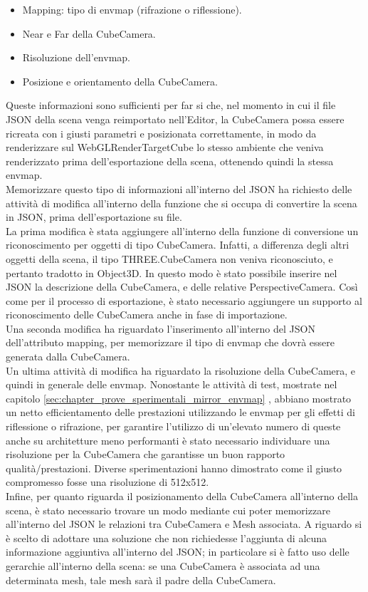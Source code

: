 \begin{itemize}
\item Mapping: tipo di envmap (rifrazione o riflessione).
\item Near e Far della CubeCamera.
\item Risoluzione dell’envmap.
\item Posizione e orientamento della CubeCamera.
\end{itemize}
Queste informazioni sono sufficienti per far si che, nel momento in cui il file JSON della scena venga reimportato nell’Editor, la CubeCamera possa essere ricreata con i giusti parametri e posizionata correttamente, in modo da renderizzare sul WebGLRenderTargetCube lo stesso ambiente che veniva renderizzato prima dell’esportazione della scena, ottenendo quindi la stessa envmap.
\\
Memorizzare questo tipo di informazioni all’interno del JSON ha richiesto delle attività di modifica all’interno della funzione che si occupa di convertire la scena in JSON, prima dell’esportazione su file.
\\
La prima modifica è stata aggiungere all’interno della funzione di conversione un riconoscimento per oggetti di tipo CubeCamera. Infatti, a differenza degli altri oggetti della scena, il tipo THREE.CubeCamera non veniva riconosciuto, e pertanto tradotto in Object3D. In questo modo è stato possibile inserire nel JSON la descrizione della CubeCamera, e delle relative PerspectiveCamera. Così come per il processo di esportazione, è stato necessario aggiungere un supporto al riconoscimento delle CubeCamera anche in fase di importazione.
\\ 
Una seconda modifica ha riguardato l’inserimento all’interno del JSON dell’attributo mapping, per memorizzare il tipo di envmap che dovrà essere generata dalla CubeCamera.
\\
Un ultima attività di modifica ha riguardato la risoluzione della CubeCamera, e quindi in generale delle envmap. Nonostante le attività di test, mostrate nel capitolo \ref{sec:chapter_prove_sperimentali_mirror_envmap} , abbiano mostrato un netto efficientamento delle prestazioni utilizzando le envmap per gli effetti di riflessione o rifrazione, per garantire l’utilizzo di un’elevato numero di queste anche su architetture meno performanti è stato necessario individuare una risoluzione per la CubeCamera che garantisse un buon rapporto qualità/prestazioni. Diverse sperimentazioni hanno dimostrato come il giusto compromesso fosse una risoluzione di 512x512.
\\
Infine, per quanto riguarda il posizionamento della CubeCamera all’interno della scena, è stato necessario trovare un modo mediante cui poter memorizzare all’interno del JSON le relazioni tra CubeCamera e Mesh associata. A riguardo si è scelto di adottare una soluzione che non richiedesse l’aggiunta di alcuna informazione aggiuntiva all’interno del JSON; in particolare si è fatto uso delle gerarchie all’interno della scena: se una CubeCamera è associata ad una determinata mesh, tale mesh sarà il padre della CubeCamera. 

